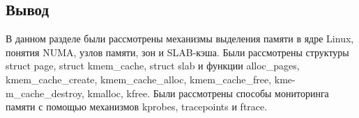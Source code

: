 

\subsection*{Вывод}

В данном разделе были рассмотрены механизмы выделения памяти в ядре Linux, понятия NUMA, узлов памяти, зон и SLAB-кэша.
Были рассмотрены структуры struct page, struct kmem\_cache, struct slab и функции alloc\_pages, kmem\_cache\_create, kmem\_cache\_alloc, kmem\_cache\_free, kme-m\_cache\_destroy, kmalloc, kfree.
Были рассмотрены способы мониторинга памяти с помощью механизмов kprobes, tracepoints и ftrace.
